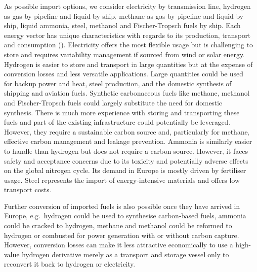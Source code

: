 

As possible import options, we consider electricity by transmission line,
hydrogen as gas by pipeline and liquid by ship, methane as gas by pipeline and
liquid by ship, liquid ammonia, steel, methanol and Fischer-Tropsch fuels by
ship. Each energy vector has unique characteristics with regards to its
production, transport and consumption
(). Electricity offers the most
flexible usage but is challenging to store and requires variability management
if sourced from wind or solar energy. Hydrogen is easier to store and transport
in large quantities but at the expense of conversion losses and less versatile
applications. Large quantities could be used for backup power and heat, steel
production, and the domestic synthesis of shipping and aviation fuels. Synthetic
carbonaceous fuels like methane, methanol and Fischer-Tropsch fuels could
largely substitute the need for domestic synthesis. There is much more
experience with storing and transporting these fuels and part of the existing
infrastructure could potentially be leveraged. However, they require a
sustainable carbon source and, particularly for methane, effective carbon
management and leakage prevention.\cite{shirizadehImpactMethaneLeakage2023}
Ammonia is similarly easier to handle than hydrogen but does not require a
carbon source. However, it faces safety and acceptance concerns due to its
toxicity and potentially adverse effects on the global nitrogen
cycle.\cite{bertagniMinimizingImpactsAmmonia2023,wolframUsingAmmoniaShipping2022}
Its demand in Europe is mostly driven by fertiliser usage. Steel represents the
import of energy-intensive materials and offers low transport costs.

Further conversion of imported fuels is also possible once they have arrived in
Europe, e.g.~hydrogen could be used to synthesise carbon-based fuels, ammonia
could be cracked to hydrogen, methane and methanol could be reformed to hydrogen
or combusted for power generation with or without carbon capture. However,
conversion losses can make it less attractive economically to use a high-value
hydrogen derivative merely as a transport and storage vessel only to reconvert
it back to hydrogen or electricity.


